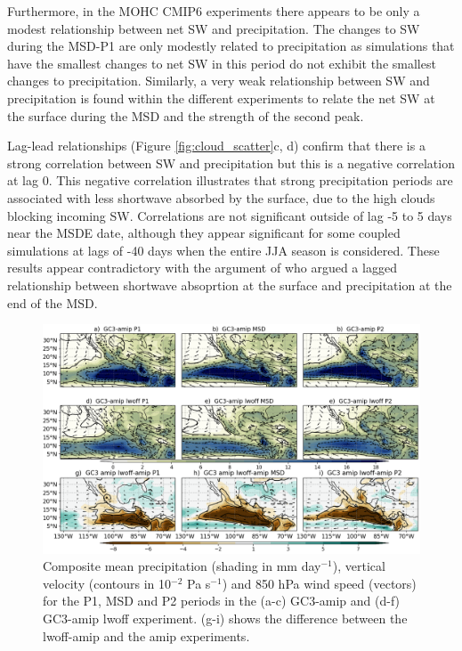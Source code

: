Furthermore, in the MOHC CMIP6 experiments there appears to be only a modest relationship between net SW and precipitation. The changes to SW during the MSD-P1 are only modestly related to precipitation as simulations that have the smallest changes to net SW in this period do not exhibit the smallest changes to precipitation. Similarly, a very weak relationship between SW and precipitation is found within the different experiments to relate the net SW at the surface during the MSD and the strength of the second peak. 

Lag-lead relationships (Figure \ref{fig:cloud_scatter}c, d) confirm that there is a strong correlation between SW and precipitation but this is a negative correlation at lag 0. This negative correlation illustrates that strong precipitation periods are associated with less shortwave absorbed by the surface, due to the high clouds blocking incoming SW. Correlations are not significant outside of lag -5 to 5 days near the MSDE date, although they appear significant for some coupled simulations at lags of -40 days when the entire JJA season is considered. These results appear contradictory with the argument of \cite{karnauskas2013} who argued a lagged relationship between shortwave absoprtion at the surface and precipitation at the end of the MSD. 


 
\begin{figure}[t!]
\includegraphics[width=\linewidth]{figures/lwfig_clim_1.png}
\caption[Composite moisture flux and wind speed]{Composite mean precipitation (shading in mm day$^{-1}$), vertical velocity (contours in 10$^{-2}$ Pa s$^{-1}$) and 850 hPa wind speed (vectors) for the P1, MSD and P2 periods in the (a-c) GC3-amip and (d-f) GC3-amip lwoff experiment. (g-i) shows the difference between the lwoff-amip and the amip experiments.}
\label{fig:lwoff}
\end{figure}

